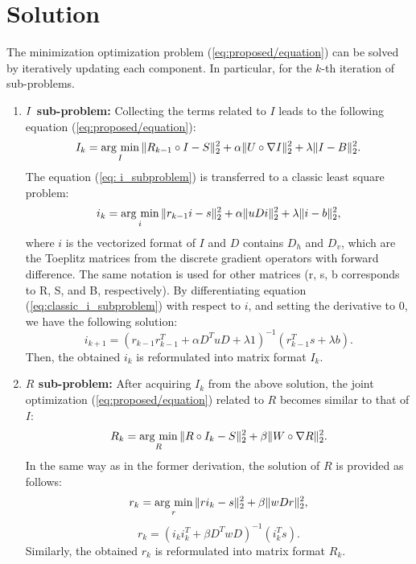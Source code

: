 \section{Solution} \label{sec:solution}
The minimization optimization problem (\ref{eq:proposed/equation}) can be solved by iteratively updating each component. In particular, for the $k$-th iteration of sub-problems.
\begin{enumerate}
\renewcommand{\labelenumi}{\arabic{enumi}).}
\item \textbf{$\boldmath{I}$ sub-problem:} Collecting the terms related to $I$ leads to the following equation (\ref{eq:proposed/equation}):
\begin{equation}
I_{k} = \mathop{\rm arg~min}\limits_{I}\|R_{k-1} \circ I - S\|_{2}^{2} + \alpha\|U \circ \nabla{I}\|_{2}^{2} 
+\lambda \|I - B\|_{2}^{2}. \label{eq: i_subproblem}
\end{equation}
The equation (\ref{eq: i_subproblem}) is transferred to a classic least square problem:
\begin{equation}
i_{k} = \mathop{\rm arg~min}\limits_{i} \|r_{k-1} i - s\|_{2}^{2} + \alpha\|uDi\|_{2}^{2} + \lambda \|i - b\|_{2}^{2}, \label{eq:classic_i_subproblem}
\end{equation}
where $i$ is the vectorized format of $I$ and $D$ contains $D_{h}$ and $D_{v}$, which are the Toeplitz matrices from the discrete gradient operators with forward difference.
The same notation is used for other matrices (r, s, b corresponds to R, S, and B, respectively). By differentiating equation (\ref{eq:classic_i_subproblem}) with respect to $i$, and setting the derivative to $0$, we have the following solution:
\begin{equation}
i_{k+1} = (r_{k-1}r_{k-1}^{T} + \alpha D^{T}uD + \lambda{1})^{-1} (r_{k-1}^{T}s + \lambda{b}). \label{eq: i_solution}
\end{equation}
Then, the obtained $i_{k}$ is reformulated into matrix format $I_{k}$.
\item \textbf{$R$ sub-problem:} After acquiring $I_{k}$ from the above solution, the joint optimization (\ref{eq:proposed/equation}) related to $R$ becomes similar to that of $I$:
\begin{equation}
R_{k} = \mathop{\rm arg~min}\limits_{R}\|R \circ I_{k} - S\|_{2}^{2} + \beta\|W \circ \nabla{R}\|_{2}^{2}. \label{eq: r_subproblem}
\end{equation}
In the same way as in the former derivation, the solution of $R$ is provided as follows:
\begin{equation}
r_{k} = \mathop{\rm arg~min}\limits_{r} \|ri_{k} - s\|_{2}^{2} + \beta\|wDr\|_{2}^{2}, \label{eq:classic_r_subproblem}
\end{equation}
\begin{equation}
r_{k} = (i_{k}i_{k}^{T} + \beta D^{T}wD)^{-1} (i_{k}^{T}s). \label{eq: solution_r_subproblem}
\end{equation}
Similarly, the obtained $r_{k}$ is reformulated into matrix format $R_{k}$.
\end{enumerate}
